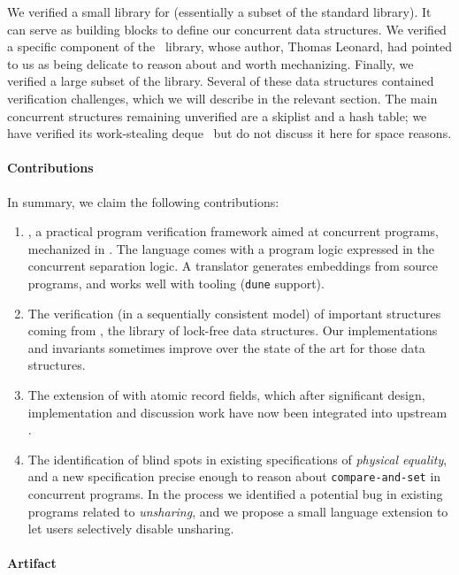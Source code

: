 We verified a small library for \ZooLang (essentially a subset of the \OCaml standard library).
It can serve as building blocks to define our concurrent data structures.
We verified a specific component of the \Eio~library, whose author, Thomas Leonard, had pointed to us as being delicate to reason about and worth mechanizing.
Finally, we verified a large subset of the \Saturn library.
Several of these data structures contained verification challenges, which we will describe in the relevant section.
The main \Saturn concurrent structures remaining unverified are a skiplist and a hash table; we have verified its work-stealing deque~\citep{DBLP:conf/spaa/ChaseL05} but do not discuss it here for space reasons.

\paragraph{Contributions}

In summary, we claim the following contributions:
\begin{enumerate}
  \item
    \Zoo, a practical program verification framework aimed at concurrent \OCaml programs, mechanized in \Rocq.
    The language \ZooLang comes with a program logic expressed in the \Iris concurrent separation logic.
    A translator \ocamlToZoo generates \Rocq embeddings from source \OCaml programs, and works well with \OCaml tooling (\texttt{dune} support).
  \item
    The verification (in a sequentially consistent model) of important structures coming from \Saturn, the \OCamlFive library of lock-free data structures.
    Our implementations and invariants sometimes improve over the \Iris state of the art for those data structures.
  \item
    The extension of \OCaml with atomic record fields, which after significant design, implementation and discussion work have now been integrated into upstream \OCaml.
  \item
    The identification of blind spots in existing specifications of \emph{physical equality}, and a new specification precise enough to reason about \texttt{compare-and-set} in concurrent programs.
    In the process we identified a potential bug in existing \OCaml programs related to \emph{unsharing}, and we propose a small language extension to let users selectively disable unsharing.
\end{enumerate}

\paragraph{Artifact}

